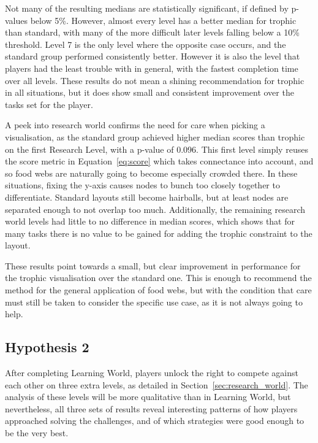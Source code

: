Not many of the resulting medians are statistically significant, if defined by p-values below 5\%. However, almost every level has a better median for trophic than standard, with many of the more difficult later levels falling below a 10\% threshold.
Level 7 is the only level where the opposite case occurs, and the standard group performed consistently better. However it is also the level that players had the least trouble with in general, with the fastest completion time over all levels.
These results do not mean a shining recommendation for trophic in all situations, but it does show small and consistent improvement over the tasks set for the player.

A peek into research world confirms the need for care when picking a visualisation, as the standard group achieved higher median scores than trophic on the first Research Level, with a p-value of 0.096. This first level simply reuses the score metric in Equation~\eqref{eq:score} which takes connectance into account, and so food webs are naturally going to become especially crowded there. In these situations, fixing the y-axis causes nodes to bunch too closely together to differentiate. Standard layouts still become hairballs, but at least nodes are separated enough to not overlap too much.
Additionally, the remaining research world levels had little to no difference in median scores, which shows that for many tasks there is no value to be gained for adding the trophic constraint to the layout.

These results point towards a small, but clear improvement in performance for the trophic visualisation over the standard one. This is enough to recommend the method for the general application of food webs, but with the condition that care must still be taken to consider the specific use case, as it is not always going to help.

\subsection{Hypothesis 2}
\label{sec:hypothesis2}

After completing Learning World, players unlock the right to compete against each other on three extra levels, as detailed in Section~\ref{sec:research_world}.
The analysis of these levels will be more qualitative than in Learning World, but nevertheless, all three sets of results reveal interesting patterns of how players approached solving the challenges, and of which strategies were good enough to be the very best.

